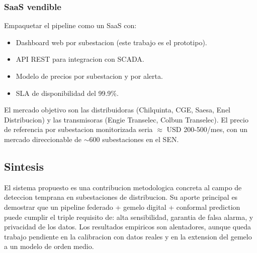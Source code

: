 \subsubsection{SaaS vendible}

Empaquetar el pipeline como un SaaS con:

\begin{itemize}[leftmargin=*,itemsep=2pt]
  \item Dashboard web por subestacion (este trabajo es el prototipo).
  \item API REST para integracion con SCADA.
  \item Modelo de precios por subestacion y por alerta.
  \item SLA de disponibilidad del 99.9\%.
\end{itemize}

El mercado objetivo son las distribuidoras (Chilquinta, CGE,
Saesa, Enel Distribucion) y las transmisoras (Engie Transelec,
Colbun Transelec). El precio de referencia por subestacion
monitorizada seria $\approx$ USD 200-500/mes, con un mercado
direccionable de $\sim 600$ subestaciones en el SEN.

\subsection{Sintesis}

El sistema propuesto es una contribucion metodologica concreta al
campo de deteccion temprana en subestaciones de distribucion. Su
aporte principal es demostrar que un pipeline federado + gemelo
digital + conformal prediction puede cumplir el triple requisito
de: alta sensibilidad, garantia de falsa alarma, y privacidad de
los datos. Los resultados empiricos son alentadores, aunque
queda trabajo pendiente en la calibracion con datos reales y en
la extension del gemelo a un modelo de orden medio.